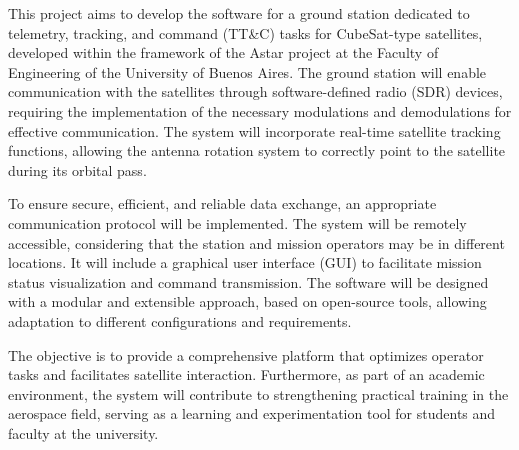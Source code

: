 This project aims to develop the software for a ground station dedicated to telemetry, tracking, and command (TT\&C) tasks for CubeSat-type satellites, developed within the framework of the Astar project at the Faculty of Engineering of the University of Buenos Aires. The ground station will enable communication with the satellites through software-defined radio (SDR) devices, requiring the implementation of the necessary modulations and demodulations for effective communication. The system will incorporate real-time satellite tracking functions, allowing the antenna rotation system to correctly point to the satellite during its orbital pass.

To ensure secure, efficient, and reliable data exchange, an appropriate communication protocol will be implemented. The system will be remotely accessible, considering that the station and mission operators may be in different locations. It will include a graphical user interface (GUI) to facilitate mission status visualization and command transmission. The software will be designed with a modular and extensible approach, based on open-source tools, allowing adaptation to different configurations and requirements.

The objective is to provide a comprehensive platform that optimizes operator tasks and facilitates satellite interaction. Furthermore, as part of an academic environment, the system will contribute to strengthening practical training in the aerospace field, serving as a learning and experimentation tool for students and faculty at the university.
